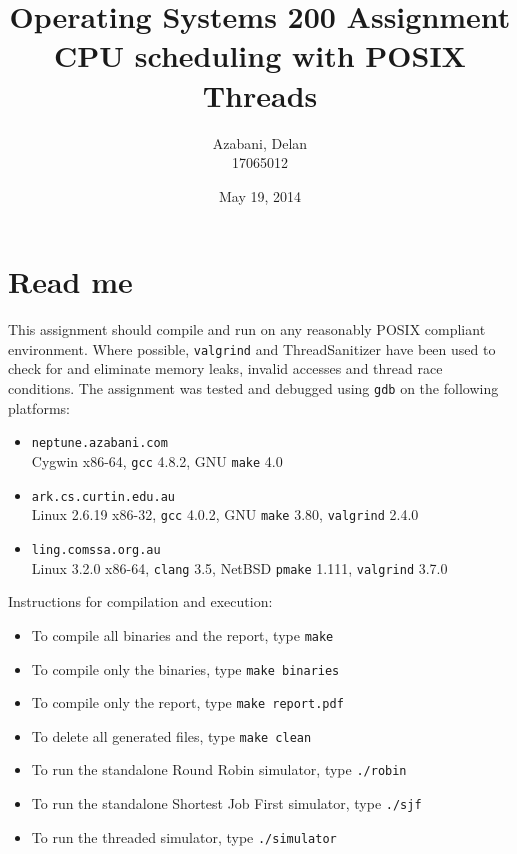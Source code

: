 \documentclass[a4paper,12pt,titlepage]{article}
\title{Operating Systems 200 Assignment\\
       CPU scheduling with POSIX Threads}
\date{May 19, 2014}
\author{Azabani, Delan\\17065012}
\begin{document}
\maketitle

\section{Read me}

This assignment should compile and run on any reasonably POSIX compliant
environment. Where possible, \texttt{valgrind} and ThreadSanitizer have been
used to check for and eliminate memory leaks, invalid accesses and thread race
conditions. The assignment was tested and debugged using \texttt{gdb} on the
following platforms:

\begin{itemize}
	\item \texttt{neptune.azabani.com}\\
	      Cygwin x86-64,
	      \texttt{gcc} 4.8.2,
	      GNU \texttt{make} 4.0
	\item \texttt{ark.cs.curtin.edu.au}\\
	      Linux 2.6.19 x86-32,
	      \texttt{gcc} 4.0.2,
	      GNU \texttt{make} 3.80,
	      \texttt{valgrind} 2.4.0
	\item \texttt{ling.comssa.org.au}\\
	      Linux 3.2.0 x86-64,
	      \texttt{clang} 3.5,
	      NetBSD \texttt{pmake} 1.111,
	      \texttt{valgrind} 3.7.0
\end{itemize}

Instructions for compilation and execution:

\begin{itemize}
	\item To compile all binaries and the report, type \texttt{make}
	\item To compile only the binaries, type \texttt{make binaries}
	\item To compile only the report, type \texttt{make report.pdf}
	\item To delete all generated files, type \texttt{make clean}
	\item To run the standalone Round Robin simulator,
	      type \texttt{./robin}
	\item To run the standalone Shortest Job First simulator,
	      type \texttt{./sjf}
	\item To run the threaded simulator, type \texttt{./simulator}
\end{itemize}
\end{document}

